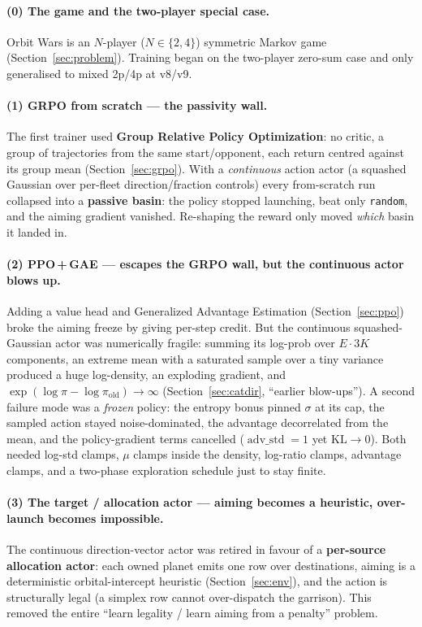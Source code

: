 \documentclass[11pt]{article}
\newcommand{\cd}[1]{\texttt{#1}}
\begin{document}
\paragraph{(0) The game and the two-player special case.} Orbit Wars is an $N$-player
($N\in\{2,4\}$) symmetric Markov game (Section~\ref{sec:problem}). Training began on the
two-player zero-sum case and only generalised to mixed 2p/4p at v8/v9.

\paragraph{(1) GRPO from scratch --- the passivity wall.} The first trainer used \textbf{Group
Relative Policy Optimization}: no critic, a group of trajectories from the same start/opponent,
each return centred against its group mean (Section~\ref{sec:grpo}). With a \emph{continuous}
action actor (a squashed Gaussian over per-fleet direction/fraction controls) every from-scratch
run collapsed into a \textbf{passive basin}: the policy stopped launching, beat only
\cd{random}, and the aiming gradient vanished. Re-shaping the reward only moved \emph{which}
basin it landed in.

\paragraph{(2) PPO\,+\,GAE --- escapes the GRPO wall, but the continuous actor blows up.}
Adding a value head and Generalized Advantage Estimation (Section~\ref{sec:ppo}) broke the
aiming freeze by giving per-step credit. But the continuous squashed-Gaussian actor was
numerically fragile: summing its log-prob over $E\!\cdot\!3K$ components, an extreme mean with a
saturated sample over a tiny variance produced a huge log-density, an exploding gradient, and
$\exp(\log\pi-\log\pi_{\mathrm{old}})\to\infty$ (Section~\ref{sec:catdir}, ``earlier blow-ups'').
A second failure mode was a \emph{frozen} policy: the entropy bonus pinned $\sigma$ at its cap,
the sampled action stayed noise-dominated, the advantage decorrelated from the mean, and the
policy-gradient terms cancelled ($\operatorname{adv\_std}=1$ yet $\mathrm{KL}\to0$). Both needed
log-std clamps, $\mu$ clamps inside the density, log-ratio clamps, advantage clamps, and a
two-phase exploration schedule just to stay finite.

\paragraph{(3) The target / allocation actor --- aiming becomes a heuristic, over-launch becomes
impossible.} The continuous direction-vector actor was retired in favour of a \textbf{per-source
allocation actor}: each owned planet emits one row over destinations, aiming is a deterministic
orbital-intercept heuristic (Section~\ref{sec:env}), and the action is structurally legal (a
simplex row cannot over-dispatch the garrison). This removed the entire ``learn legality / learn
aiming from a penalty'' problem.
\end{document}
